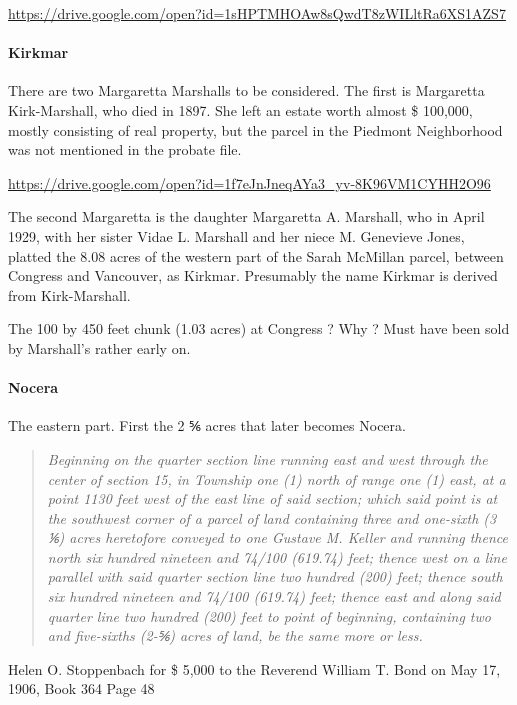 \documentclass[
  12pt,
]{book}
\begin{document}
\url{https://drive.google.com/open?id=1sHPTMHOAw8sQwdT8zWILltRa6XS1AZS7}

\hypertarget{kirkmar}{%
\paragraph{Kirkmar}\label{kirkmar}}

There are two Margaretta Marshalls to be considered. The first is Margaretta Kirk-Marshall, who died in 1897. She left an estate worth almost \$ 100,000, mostly consisting of real property, but the parcel in the Piedmont Neighborhood was not mentioned in the probate file.

\url{https://drive.google.com/open?id=1f7eJnJneqAYa3_yv-8K96VM1CYHH2O96}

The second Margaretta is the daughter Margaretta A. Marshall, who in April 1929, with her sister Vidae L. Marshall and her niece M. Genevieve Jones, platted the 8.08 acres of the western part of the Sarah McMillan parcel, between Congress and Vancouver, as Kirkmar. Presumably the name Kirkmar is derived from Kirk-Marshall.

The 100 by 450 feet chunk (1.03 acres) at Congress ? Why ? Must have been sold by Marshall's rather early on.

\hypertarget{nocera}{%
\paragraph{Nocera}\label{nocera}}

The eastern part. First the 2 ⅚ acres that later becomes Nocera.

\begin{quote}
\emph{Beginning on the quarter section line running east and west through the center of section 15, in Township one (1) north of range one (1) east, at a point 1130 feet west of the east line of said section; which said point is at the southwest corner of a parcel of land containing three and one-sixth (3 ⅙) acres heretofore conveyed to one Gustave M. Keller and running thence north six hundred nineteen and 74/100 (619.74) feet; thence west on a line parallel with said quarter section line two hundred (200) feet; thence south six hundred nineteen and 74/100 (619.74) feet; thence east and along said quarter line two hundred (200) feet to point of beginning, containing two and five-sixths (2-⅚) acres of land, be the same more or less.}
\end{quote}

Helen O. Stoppenbach for \$ 5,000 to the Reverend William T. Bond on May 17, 1906, Book 364 Page 48
\end{document}
